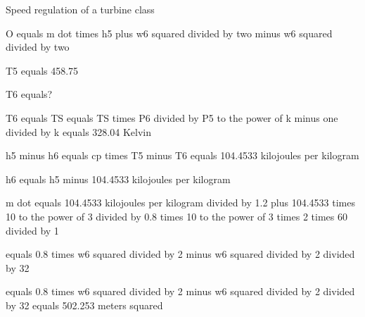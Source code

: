Speed regulation of a turbine class

O equals m dot times h5 plus w6 squared divided by two minus w6 squared divided by two

T5 equals 458.75

T6 equals?

T6 equals TS equals TS times P6 divided by P5 to the power of k minus one divided by k equals 328.04 Kelvin

h5 minus h6 equals cp times T5 minus T6 equals 104.4533 kilojoules per kilogram

h6 equals h5 minus 104.4533 kilojoules per kilogram

m dot equals 104.4533 kilojoules per kilogram divided by 1.2 plus 104.4533 times 10 to the power of 3 divided by 0.8 times 10 to the power of 3 times 2 times 60 divided by 1

equals 0.8 times w6 squared divided by 2 minus w6 squared divided by 2 divided by 32

equals 0.8 times w6 squared divided by 2 minus w6 squared divided by 2 divided by 32 equals 502.253 meters squared